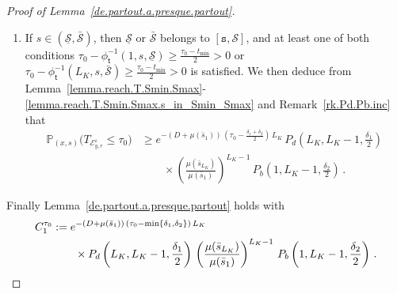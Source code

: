 \documentclass[10pt]{amsart}
\theoremstyle{definition}\newtheorem{defi}[theo]{Definition}\newtheorem{rema}[theo]{Remark}\newtheorem{exam}[theo]{Example}\newtheorem{exem}[theo]{Example}\newtheorem{nota}[theo]{Notation}
\newcommand{\PP}{\mathbb{P}}
\newcommand{\clE}{\mathcal{E}}
\newcommand{\clS}{\mathcal{S}}
\newcommand{\Smin}{\underline{\mathcal{S}}}
\newcommand{\Smax}{\bar{\mathcal{S}}}
\newcommand{\barmu}{\mu(\bar s_1)}
\newcommand{\phit}{\phi_\textsf{t}^{-1}}
\newcommand{\lmax}{{L_K}}
\newcommand{\1}{\mathbf{1}}
\begin{document}
\begin{proof}[Proof of Lemma~\ref{de.partout.a.presque.partout}]
\begin{enumerate}
\item If $s\in (\Smin, \Smax)$, then $\Smin$ or $\Smax$ belongs to $[\texttt{s},\clS]$, and at least one of both conditions $\tau_0-\phit\left(1,s,\Smin\right)
\geq \frac{\tau_0-t_{\min}}{2} >0 $ or $
\tau_0-\phit\left(\lmax,s,\Smax\right)
\geq\frac{\tau_0-t_{\min}}{2}>0 $ is satisfied. We then deduce from Lemma~\ref{lemma.reach.T.Smin.Smax}-\ref{lemma.reach.T.Smin.Smax.s_in_Smin_Smax} and Remark~\ref{rk.Pd.Pb.inc} that
\begin{align*}
\PP_{(x,s)}\big(T_{\clE_{y,r}^\varepsilon}\leq \tau_0\big) &\geq e^{-(D+\barmu)\,\left(\tau_0-\frac{\delta_1+\delta_2}{2}\right)\,\lmax}\, P_d\left(\lmax,\lmax-1, \frac{\delta_1}{2}\right)\,
\\
&\qquad \times
\left(\frac{\mu(\bar s_{\lmax})}{\barmu}\right)^{\lmax-1}\,P_b\left(1,\lmax-1, \frac{\delta_2}{2}\right)\,.
\end{align*}
\end{enumerate}
Finally Lemma~\ref{de.partout.a.presque.partout} holds with
\begin{align*}
C_1^{\tau_0}&:= e^{-(D+\barmu)\,(\tau_0-\min\{\delta_1,\delta_2\})\,\lmax}\\
& \qquad
\times P_d\left(\lmax,\lmax-1, \frac{\delta_1}{2}\right)\,
\left(\frac{\mu(\bar s_{\lmax})}{\barmu}\right)^{\lmax-1}\,P_b\left(1,\lmax-1, \frac{\delta_2}{2}\right)\,.
\qedhere
\end{align*}
\end{proof}
\end{document}
